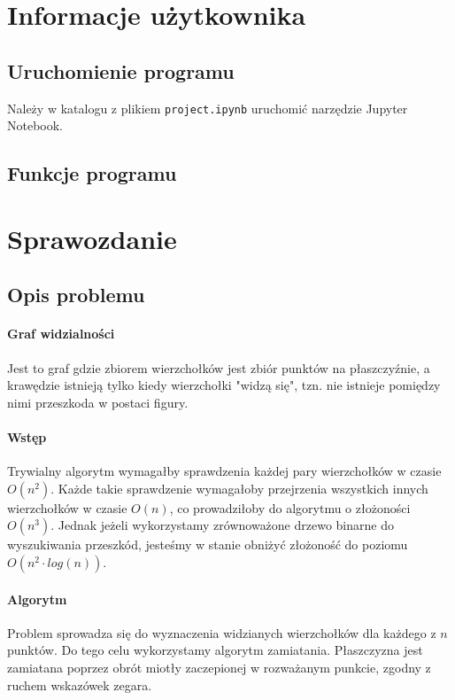 \documentclass[12pt]{article}
\begin{document}
	\section{Informacje użytkownika}
	
	\subsection{Uruchomienie programu}
		Należy w katalogu z plikiem \lstinline|project.ipynb| uruchomić narzędzie Jupyter Notebook.
	
	\subsection{Funkcje programu}
	
	\section{Sprawozdanie}
	
	\subsection{Opis problemu}
		\paragraph{Graf widzialności}
			Jest to graf gdzie zbiorem wierzchołków jest zbiór punktów na płaszczyźnie, a krawędzie istnieją tylko kiedy wierzchołki "widzą się", tzn. nie istnieje pomiędzy nimi przeszkoda w postaci figury.
		
		\paragraph{Wstęp}
			Trywialny algorytm wymagałby sprawdzenia każdej pary wierzchołków w czasie $ O(n^2) $. Każde takie sprawdzenie wymagałoby przejrzenia wszystkich innych wierzchołków w czasie $ O(n) $, co prowadziłoby do algorytmu o złożoności $ O(n^3) $. Jednak jeżeli wykorzystamy zrównoważone drzewo binarne do wyszukiwania przeszkód, jesteśmy w stanie obniżyć złożoność do poziomu $ O(n^2 \cdot log(n)) $.
		
		\paragraph{Algorytm}
			Problem sprowadza się do wyznaczenia widzianych wierzchołków dla każdego z $ n $ punktów. Do tego celu wykorzystamy algorytm zamiatania. Płaszczyzna jest zamiatana poprzez obrót miotły zaczepionej w rozważanym punkcie, zgodny z ruchem wskazówek zegara.
			
\end{document}
